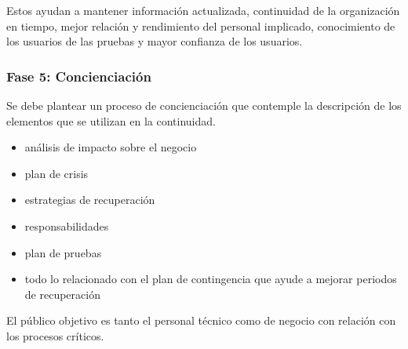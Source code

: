             Estos ayudan a mantener información actualizada, continuidad de la organización en tiempo, mejor relación y rendimiento del personal implicado, conocimiento de los usuarios de las pruebas y mayor confianza de los usuarios.

    \subsubsection{Fase 5: Concienciación} %
        Se debe plantear un proceso de concienciación que contemple la descripción de los elementos que se utilizan en la continuidad.
        \begin{itemize}
            \item análisis de impacto sobre el negocio
            \item plan de crisis
            \item estrategias de recuperación
            \item responsabilidades
            \item plan de pruebas
            \item todo lo relacionado con el plan de contingencia que ayude a mejorar periodos de recuperación
        \end{itemize}

        El público objetivo es tanto el personal técnico como de negocio con relación con los procesos críticos.

